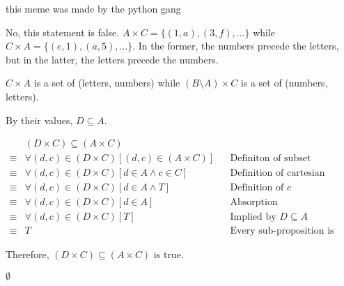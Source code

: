 \documentclass{article}
\begin{document}
\begin{outline}[enumerate]
        this meme was made by the python gang

    \1 No, this statement is false. $A \times C = \{(1, a), (3, f), ...\}$ while $C \times A = \{(e, 1), (a, 5), ...\}$. 
    In the former, the numbers precede the letters, but in the latter, the letters precede the numbers.

    \1 $C \times A$ is a set of (letters, numbers) while $(B \setminus A) \times C$ is a set of (numbers, letters). 

    \1 By their values, $D \subseteq A$.

    \begin{equation*}
        \begin{aligned}
            & (D \times C) \subseteq (A \times C) \\
            \equiv & \forall (d,c) \in (D \times C) [(d, c) \in (A \times C)] && \text{Definiton of subset} \\
            \equiv & \forall (d,c) \in (D \times C) [d \in A \wedge c \in C] && \text{Definition of cartesian product} \\
            \equiv & \forall (d,c) \in (D \times C) [d \in A \wedge T] && \text{Definition of } c \\
            \equiv & \forall (d,c) \in (D \times C) [d \in A] && \text{Absorption}  \\
            \equiv & \forall (d,c) \in (D \times C) [T] && \text{Implied by }D \subseteq A  \\
            \equiv & T && \text{Every sub-proposition is true}
        \end{aligned}
    \end{equation*}

    Therefore, $(D \times C) \subseteq (A \times C)$ is true.

    \1 $\emptyset$

\end{outline} 
\end{document}
